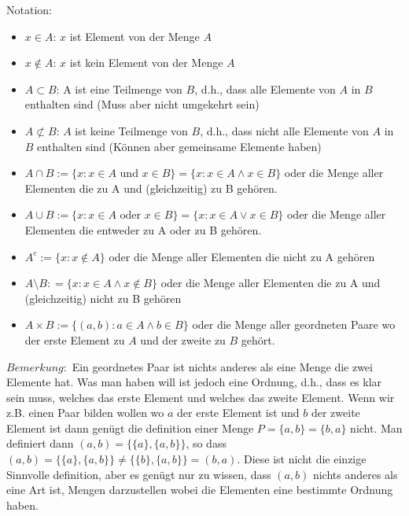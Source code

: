 \documentclass[11pt]{article} %
\begin{document}
Notation:
\begin{itemize}
\item $x \in A$: $x$ ist Element von der Menge $A$
\item $x \notin A$: $x$ ist kein Element von der Menge $A$
\item $A \subset B$: A ist eine Teilmenge von $B$, d.h., dass alle Elemente von $A$ in $B$ enthalten sind (Muss aber nicht umgekehrt sein)
\item $A \not \subset B$: $A$ ist keine Teilmenge von $B$, d.h., dass nicht alle Elemente von $A$ in $B$ enthalten sind (Können aber gemeinsame Elemente haben)
\item $A \cap B:= \{x: x \in A \textrm{ und } x \in B\} = \{x: x \in A  \wedge x \in B\}$ oder die Menge aller Elementen die zu A und (gleichzeitig) zu B gehören.
\item $A \cup B:= \{x: x \in A \textrm{ oder } x \in B\} = \{x: x \in A  \vee x \in B\}$ oder die Menge aller Elementen die entweder zu A oder zu B gehören.
\item $A^c := \{x : x \notin A\}$ oder die Menge aller Elementen die nicht zu A gehören
\item $A \setminus B: = \{x: x \in A \wedge x \notin B\} $ oder die Menge aller Elementen die zu A und (gleichzeitig) nicht zu B gehören
\item $A \times B:= \{(a,b): a \in A \wedge b \in B\}$ oder die Menge aller geordneten Paare wo der erste Element zu $A$ und der zweite zu $B$ gehört.
 
\end{itemize}

$Bemerkung:$ Ein geordnetes Paar ist nichts anderes als eine Menge die zwei Elemente hat. Was man haben will ist jedoch eine Ordnung, d.h., dass es klar sein muss, welches das erste Element und welches das zweite Element. Wenn wir z.B. einen Paar bilden wollen wo $a$ der erste Element ist und $b$ der zweite Element ist dann genügt die definition einer Menge $P = \{a,b\} = \{b,a\}$ nicht. Man definiert dann $(a,b) = \{\{a\},\{a,b\}\}$, so dass  $(a,b) = \{\{a\},\{a,b\}\} \neq \{\{b\},\{a,b\}\} = (b,a)$. Diese ist nicht die einzige Sinnvolle definition, aber es genügt nur zu wissen, dass $(a,b)$ nichts anderes als eine Art ist, Mengen darzustellen wobei die Elementen eine bestimmte Ordnung haben.\\\\ 
\end{document}

